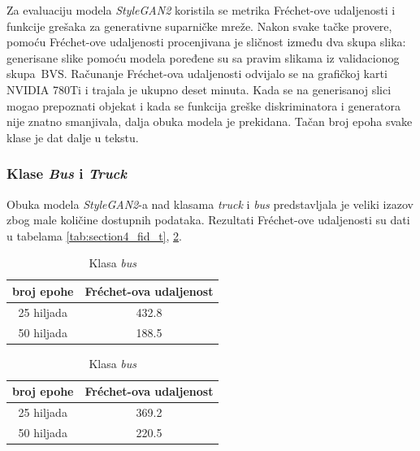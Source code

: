 \documentclass[12pt,oneside]{memoir}
\newcommand{\bvs}{\ensuremath{\,\textrm{BVS}}}
\begin{document}
Za evaluaciju modela \textit{StyleGAN2} koristila se metrika Fréchet-ove udaljenosti i funkcije grešaka za generativne suparničke mreže. Nakon svake tačke provere, pomoću Fréchet-ove udaljenosti procenjivana je sličnost između dva skupa slika: generisane slike pomoću modela poređene su sa pravim slikama iz validacionog skupa \bvs. Računanje Fréchet-ova udaljenosti odvijalo se na grafičkoj karti NVIDIA 780Ti i trajala je ukupno deset minuta. Kada se na generisanoj slici mogao prepoznati objekat i kada se funkcija greške diskriminatora i generatora nije znatno smanjivala, dalja obuka modela je prekidana. Tačan broj epoha svake klase je dat dalje u tekstu.


\subsubsection{Klase \textit{Bus} i \textit{Truck}}

Obuka modela \textit{StyleGAN2}-a nad klasama \textit{truck} i \textit{bus} predstavljala je veliki izazov zbog male količine dostupnih podataka. 
Rezultati Fréchet-ove udaljenosti su dati u tabelama \ref{tab:section4_fid_t}, \ref{tab:section4_fid_b}.

\begin{table}[!htb]
    \begin{minipage}{.5\linewidth}
      \caption{Klasa \textit{truck}}\label{tab:section4_fid_t}
      \centering
        \begin{tabular}{c|c}
        broj epohe &  Fréchet-ova udaljenost \\
        \hline
        25 hiljada & 432.8 \\
        \hline
        50 hiljada & 188.5 \\
        \end{tabular}
    \end{minipage}
    \begin{minipage}{.5\linewidth}
      \centering
        \caption{Klasa \textit{bus}}\label{tab:section4_fid_b}
        \begin{tabular}{c|c}
        broj epohe &  Fréchet-ova udaljenost \\
        \hline
        25 hiljada & 369.2 \\
        \hline
        50 hiljada & 220.5 \\
        \end{tabular}
    \end{minipage} 
\end{table}
\end{document}

